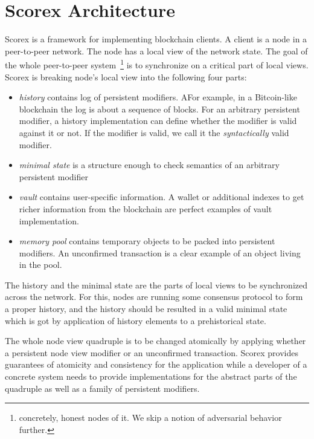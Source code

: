 
\section{Scorex Architecture}

Scorex is a framework for implementing blockchain clients. A client is a node in a peer-to-peer network. The node has a local view of the network state. The goal of the whole peer-to-peer system~\footnote{concretely, honest nodes of it. We skip a notion of adversarial behavior further.} is to synchronize on a critical part of local views. Scorex is breaking node's local view into the following four parts: 

\begin{itemize}
\item{\em history} contains log of persistent modifiers. AFor example, in a Bitcoin-like blockchain the log is about a sequence of blocks. For an arbitrary persistent modifier, a history implementation can define whether the modifier is valid against it or not.
If the modifier is valid, we call it the {\em syntactically} valid modifier.   
\item{\em minimal state} is a structure enough to check semantics of an arbitrary persistent modifier
\item{\em vault} contains user-specific information. A wallet or additional indexes to get richer information from the blockchain are perfect examples of vault implementation. 
\item{\em memory pool} contains temporary objects to be packed into persistent modifiers. An unconfirmed transaction is a clear example of an object living in the pool.
\end{itemize}

The history and the minimal state are the parts of local views to be synchronized across the network. For this, nodes are running some consensus protocol to form a proper history, and the history should be resulted in a valid minimal state which is got by application of history elements to a prehistorical state.

The whole node view quadruple is to be changed atomically by applying whether a persistent node view modifier or an unconfirmed transaction. Scorex provides guarantees of atomicity and consistency for the application while a developer of a concrete system needs to provide implementations for the abstract parts of the quadruple as well as a family of persistent modifiers.


